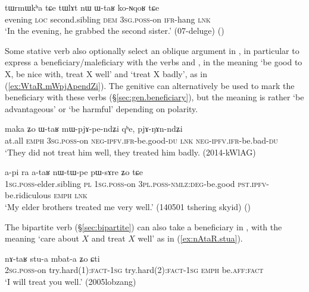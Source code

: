 \begin{exe}
\ex \label{ex:WtaR.koNqoR}
\gll tɯrmɯkʰa tɕe tɯlɤt nɯ ɯ-taʁ ko-ɴqoʁ tɕe \\
evening \textsc{loc} second.sibling \textsc{dem} \textsc{3sg}.\textsc{poss}-on \textsc{ifr}-hang \textsc{lnk} \\
\glt `In the evening, he grabbed the second sister.' (07-deluge) ()
\end{exe} 

Some stative verb also optionally select an oblique argument in , in particular to express a beneficiary/maleficiary with the verbs  and , in the meaning `be good to X, be nice with, treat X well' and `treat X badly', as in (\ref{ex:WtaR.mWpjApendZi}). The genitive can alternatively be used to mark the beneficiary with these verbs (§\ref{sec:gen.beneficiary}), but the meaning is rather `be advantageous' or `be harmful' depending on polarity.


\begin{exe}
\ex \label{ex:WtaR.mWpjApendZi}
\gll  maka ʑo ɯ-taʁ mɯ-pjɤ-pe-ndʑi qʰe, pjɤ-ŋɤn-ndʑi \\
at.all \textsc{emph} \textsc{3sg}.\textsc{poss}-on \textsc{neg}-\textsc{ipfv}.\textsc{ifr}-be.good-\textsc{du} \textsc{lnk} \textsc{neg}-\textsc{ipfv}.\textsc{ifr}-be.bad-\textsc{du} \\
\glt `They did not treat him well, they treated him badly. (2014-kWlAG)
\end{exe}

\begin{exe}
\ex \label{ex:ataR.nWtWpe}
\gll  a-pi ra a-taʁ nɯ-tɯ-pe pɯ-sɤre ʑo tɕe  \\
\textsc{1sg}.\textsc{poss}-elder.sibling \textsc{pl} \textsc{1sg}.\textsc{poss}-on \textsc{3pl}.\textsc{poss}-\textsc{nmlz}:\textsc{deg}-be.good \textsc{pst}.\textsc{ipfv}-be.ridiculous \textsc{emph} \textsc{lnk} \\
\glt `My elder brothers treated me very well.' (140501 tshering skyid)
()
\end{exe}

The bipartite verb  (§\ref{sec:bipartite}) can also take a beneficiary in , with the meaning `care about $X$ and treat $X$ well' as in (\ref{ex:nAtaR.stua}).

\begin{exe}
\ex \label{ex:nAtaR.stua}
\gll nɤ-taʁ stu-a mbat-a ʑo ɕti\\
\textsc{2sg}.\textsc{poss}-on try.hard(1):\textsc{fact}-\textsc{1sg} try.hard(2):\textsc{fact}-\textsc{1sg} \textsc{emph} be.\textsc{aff}:\textsc{fact}\\
\glt `I will treat you well.' (2005lobzang)
\end{exe}


